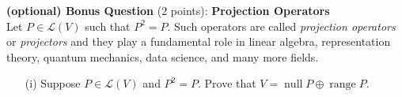 \documentclass[11pt,letterpaper]{article}
\begin{document}
\textbf{(optional) Bonus Question} (2 points): \textbf{Projection Operators}\\
Let $P \in \mathcal{L}(V)$ such that $P^2 =P$. Such operators are called \textit{projection operators} or \textit{projectors} and they play a fundamental role in linear algebra, representation theory, quantum mechanics, data science, and many more fields. 

\begin{enumerate}
    \item[(i)] Suppose $P \in \mathcal{L}(V)$ and $P^2 = P$. Prove that $V = \operatorname{null}{P} \oplus \operatorname{range}{P}$.
\end{enumerate}
\end{document}
